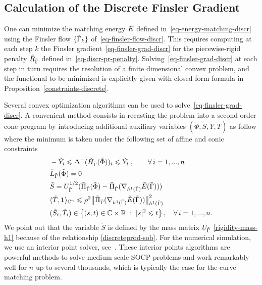 \subsection{Calculation of the Discrete Finsler Gradient}
\label{calculation-finsler}

One can minimize the matching energy $\tilde{E}$ defined in~\eqref{eq-energy-matching-discr} using the Finsler flow $\{\tilde{\Gamma}_k\}$ of~\eqref{eq-finsler-flow-discr}. This requires computing at each step $k$ the Finsler gradient~\eqref{eq-finsler-grad-discr} for the piecewise-rigid penalty $\tilde{R}_{\tilde{\Gamma}}$ defined in~\eqref{eq-discr-pr-penalty}. Solving~\eqref{eq-finsler-grad-discr} at each step in turn requires the resolution of a finite dimensional convex problem, and the functional to be minimized is explicitly given with closed form formula in Proposition~\ref{constraints-discrete}.

Several convex optimization algorithms can be used to solve~\eqref{eq-finsler-grad-discr}. A convenient method consists in recasting the problem into a second order cone program by introducing additional auxiliary variables $(\tilde{\Phi}, \tilde{S},\tilde{Y},\tilde{T})$ as follow
where the minimum is taken under the following set of affine and conic constraints
\begin{align*}
	& -\tilde{Y}_i\leqslant \Delta^-( \tilde{H}_{\tilde \Gamma} (\tilde \Phi) )_i  \leqslant \tilde{Y}_i \;,\quad \quad  \forall \, i=1,...,n \\
	& \tilde{L}_{\tilde{\Gamma}}(\tilde{\Phi}) =0 \\
	& \tilde{S} =  U_{\tilde{\Gamma}}^{1/2}(\tilde{\Pi}_{\tilde{\Gamma}}(\tilde{\Phi}) - \tilde{\Pi}_{\tilde{\Gamma}}(\nabla_{h^1(\tilde{\Gamma})} \tilde{E}(\tilde{\Gamma}))) \\
	& \langle \tilde{T}, {\bf 1}\rangle_{\mathbb{C}^n} \leqslant \rho^2 \big\| \tilde{\Pi}_{\tilde{\Gamma}}( \nabla_{h^1(\tilde{\Gamma})} \tilde{E}(\tilde{\Gamma}))  \big\|_{h^1(\tilde{\Gamma})}^2  \\
	& (\tilde{S}_i,\tilde{T}_i) \in 
		\left\{  (s,t) \in \mathbb{C} \times \mathbb{R}  \;:\;  |s|^2 \leqslant t  \right\} ,\quad \forall \, i=1,...,n.
\end{align*}
We point out that the variable $\tilde{S}$ is defined by the mass matrix $U_{\tilde{\Gamma}}$ \eqref{rigidity-mass-h1} because of the relationship \eqref{discreteprod-sob}. For the numerical simulation, we use an interior point solver, see~\cite{convex-optimization}. These interior points algorithms are powerful methods to solve medium scale SOCP problems and work remarkably well for $n$ up to several thousands, which is typically the case for the curve matching problem.
